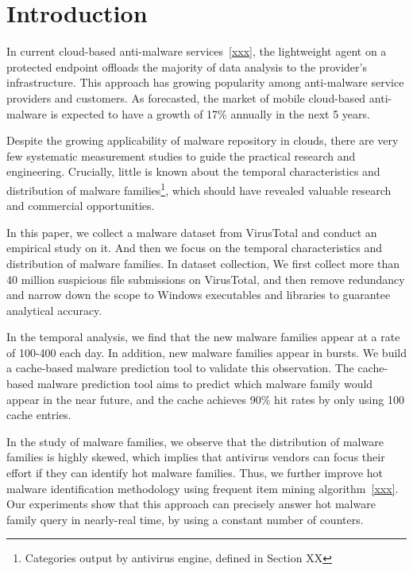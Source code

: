 \section{Introduction}
In current cloud-based anti-malware services~\ref{xxx}, the lightweight agent on a protected endpoint offloads the majority of data analysis to the provider's infrastructure. This approach has growing popularity among anti-malware service providers and customers. As forecasted, the market of mobile cloud-based anti-malware is expected to have a growth of 17\% annually in the next 5 years.

Despite the growing applicability of malware repository in clouds, there are very few systematic measurement studies to guide the practical research and engineering. Crucially, little is known about the temporal characteristics and distribution of malware families\footnote{Categories output by antivirus engine, defined in Section XX}, which should have revealed valuable research and commercial opportunities.

In this paper, we collect a malware dataset from VirusTotal and conduct an empirical study on it. And then we focus on the temporal characteristics and distribution of malware families. In dataset collection, We first collect more than 40 million suspicious file submissions on VirusTotal, and then remove redundancy and narrow down the scope to Windows executables and libraries to guarantee analytical accuracy.

In the temporal analysis, we find that the new malware families appear at a rate of 100-400 each day. In addition, new malware families appear in bursts. We build a cache-based malware prediction tool to validate this observation. The cache-based malware prediction tool aims to predict which malware family would appear in the near future, and the cache achieves 90\% hit rates by only using 100 cache entries.

In the study of malware families, we observe that the distribution of malware families is highly skewed, which implies that antivirus vendors can focus their effort if they can identify hot malware families.
Thus, we further improve hot malware identification methodology using frequent item mining algorithm~\ref{xxx}.
Our experiments show that this approach can precisely answer hot malware family query in nearly-real time, by using a constant number of counters. 

